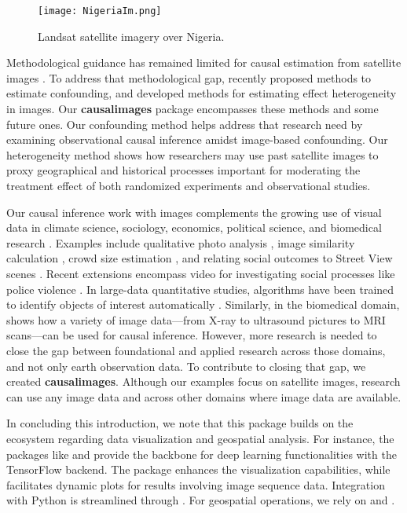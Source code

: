 \documentclass[nojss,shortnames]{jss} %
\begin{document}
\begin{figure}[H] \centering
\texttt{[image: NigeriaIm.png]}
\caption{ Landsat satellite imagery over Nigeria. }  \label{f:NigeriaViz}
\end{figure}

Methodological guidance has remained limited for causal estimation from satellite images \citep{daoud_statistical_2023}. To address that methodological gap, recently \citet{jerzak2022estimating} proposed methods to estimate confounding, and \citet{jejoda2022_hetero}  developed methods for estimating effect heterogeneity in images. Our {\bf causalimages} package encompasses these methods and some future ones. Our confounding method helps address that research need by examining observational causal inference amidst image-based confounding. Our heterogeneity method shows how researchers may use past satellite images to proxy geographical and historical processes important for moderating the treatment effect of both randomized experiments and observational studies. 

Our causal inference work with images complements the growing use of visual data in climate science, sociology, economics, political science, and biomedical research \citep{kino_scoping_2021,daoud_statistical_2023}. Examples include qualitative photo analysis \citep{pauwels_visual_2010,ohara_participant_2019}, image similarity calculation \citep{zhang_image_2022}, crowd size estimation \citep{cruz_unbiased_2021}, and relating social outcomes to Street View scenes \citep{gebru2017using}. Recent extensions encompass video for investigating social processes like police violence \citep{nassauer_video_2021}. In large-data quantitative studies, algorithms have been trained to identify objects of interest automatically \citep{torres_learning_2022}. Similarly, in the biomedical domain, \citet{castroCausalityMattersMedical2020} shows how a variety of image data---from X-ray to ultrasound pictures to MRI scans---can be used for causal inference. However, more research is needed to close the gap between foundational and applied research across those domains, and not only earth observation data. To contribute to closing that gap, we created  {\bf causalimages}. Although our examples focus on satellite images, research can use any image data and across other domains where image data are available.

In concluding this introduction, we note that this package builds on the  ecosystem regarding data visualization and geospatial analysis. For instance, the  packages like  and  provide the backbone 
for deep learning functionalities with the TensorFlow backend. The  package enhances the 
visualization capabilities, while  facilitates dynamic plots for results involving image sequence data. Integration with 
Python is streamlined through . For geospatial operations, we rely on  
and . 
\end{document}
